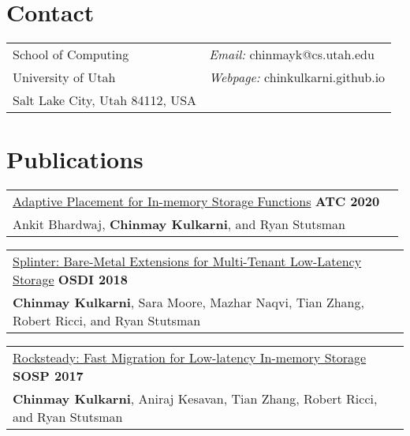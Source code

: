\documentclass[margin,line]{res}
\begin{document}
\name{Chinmay Kulkarni\newline %
      {\small PhD Student, University of Utah}}
\begin{resume}
\section{\sc Contact}
 \begin{tabular}{@{}p{3.25in}p{4in}}
 School of Computing                             & {\it Email:  }  chinmayk@cs.utah.edu \\
 University of Utah                              & {\it Webpage:}  chinkulkarni.github.io \\
 Salt Lake City, Utah 84112, USA                 \\
 \end{tabular}


\section{\sc Publications}
 \vspace{-2.5pt}
 \begin{tabular}{@{}p{5.5in}p{4in}}
 \href{http://utah.systems/projects/kulkarni\_splinter}{Adaptive
 Placement for In-memory Storage Functions} \hfill
 {\small\bf ATC 2020}\\
 {\small Ankit Bhardwaj, {\bf Chinmay Kulkarni}, and Ryan Stutsman}\\
 \end{tabular}

 \vspace{-2.5pt}
 \begin{tabular}{@{}p{5.5in}p{4in}}
 \href{http://utah.systems/projects/kulkarni\_splinter}{Splinter:
 Bare-Metal Extensions for Multi-Tenant Low-Latency Storage} \hfill
 {\small\bf OSDI 2018}\\
 {\small{\bf Chinmay Kulkarni}, Sara Moore, Mazhar Naqvi, Tian Zhang, Robert
 Ricci, and Ryan Stutsman}\\
 \end{tabular}

 \vspace{-2.5pt}
 \begin{tabular}{@{}p{5.5in}p{4in}}
 \href{http://utah.systems/projects/kulkarni\_rocksteady}{Rocksteady: Fast
 Migration for Low-latency In-memory Storage} \hfill
 {\small\bf SOSP 2017}\\
 {\small{\bf Chinmay Kulkarni}, Aniraj Kesavan, Tian Zhang, Robert
 Ricci, and Ryan Stutsman}\\
 \end{tabular}


\end{resume}
\end{document}
